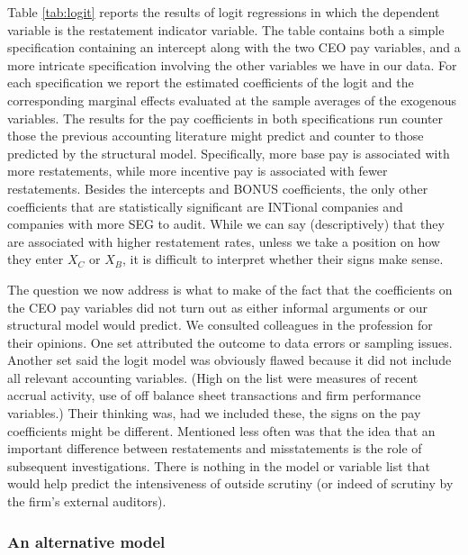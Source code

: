 Table \ref{tab:logit} reports the results of logit regressions in which the dependent variable is the restatement indicator variable. 
The table contains both a simple specification containing an intercept along with the two CEO pay variables,  and a more intricate specification involving the other variables we have in our data.
For each specification we report the estimated coefficients of the logit and the  corresponding marginal effects evaluated at the sample averages of the exogenous variables.%
The results for the pay coefficients in both specifications run counter those the previous accounting literature might predict and counter to those predicted by the structural model.
Specifically,  more base pay is associated with more restatements, while more incentive pay is associated with fewer restatements.
Besides the intercepts and BONUS coefficients, the only other coefficients  that are statistically significant are INTional companies and companies with more SEG to audit. 
While we can say (descriptively) that they are associated with higher restatement rates, unless we take a position on how they enter $X_C$ or $X_B$, it is difficult to interpret whether their signs make sense.

The question we now address is what to make of the fact that the coefficients on the CEO pay variables did not turn out as either informal arguments or our structural model would predict. 
We consulted colleagues in the profession for their opinions. 
One set attributed the outcome to data errors or sampling issues. 
Another set said the logit model was obviously flawed because it did not include all relevant accounting variables. (High on the list were measures
of recent accrual activity, use of off balance sheet transactions and firm
performance variables.) 
Their thinking was, had we included these, the signs on the pay coefficients might be different. 
Mentioned less often was that the idea that an important difference between restatements and misstatements is the role of subsequent investigations. 
There is nothing in the model or variable list that would help predict  the intensiveness of outside scrutiny (or indeed of scrutiny by the firm's external auditors).

\subsubsection{An alternative model}

